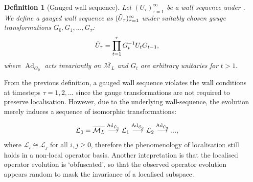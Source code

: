 \documentclass[11pt, twocolumn, floatfix, superscriptaddress, aps, prb, raggedbottom]{revtex4-2}
\newtheorem{definition}{Definition}[section]
\DeclareMathOperator{\Ad}{Ad}
\begin{document}
\begin{definition}[Gauged wall sequence]
    Let $(U_{\tau})_{\tau = 1}^{\infty}$ be a wall sequence under . We define a gauged wall sequence as $(\Tilde{U}_{\tau})_{\tau = 1}^{\infty}$ under suitably chosen gauge transformations $G_0, G_1, ... ,G_{\tau}$:
    \begin{equation}
        \Tilde{U}_{\tau} = \prod_{t=1}^{\tau}{G}^{-1}_tU_t{G_{t-1}},
    \end{equation}
    where $\Ad_{G_0}$ acts invariantly on $\overline{\mathcal{M}_L}$ and $G_{t}$ are arbitrary unitaries for $t>1$. 
    \label{def:gauged_wall_sequence}
\end{definition}

From the previous definition, a gauged wall sequence violates the wall conditions at timesteps $\tau = 1, 2, ...$ since the gauge transformations are not required to preserve localisation. However, due to the underlying wall-sequence, the evolution merely induces a sequence of isomorphic transformations: 

\begin{equation}
    \mathcal{L}_0 = \overline{\mathcal{M}_L} \overset{\Ad_{\Tilde{U}_1}}{\longrightarrow} \mathcal{L}_1 \overset{\Ad_{\Tilde{U}_2}}{\longrightarrow} \mathcal{L}_2 \overset{\Ad_{\Tilde{U}_3}}{\longrightarrow} ...,
\end{equation}
\noindent where $\mathcal{L}_i \cong \mathcal{L}_j$ for all $i, j \geq 0$, therefore the phenomenology of localisation still holds in a non-local operator basis. Another intepretation is that the localised operator evolution is \enquote*{obfuscated}, so that the observed operator evolution appears random to mask the invariance of a localised subspace. 
\end{document}
